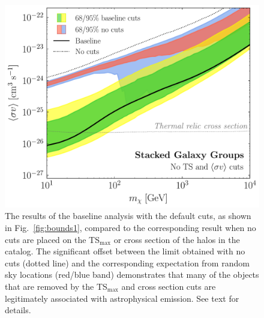 \begin{figure}[tb]
  \centering
  \includegraphics[width=.7\textwidth]{ch-clusters/plots/systematics_nots_cuts.pdf}
  \caption{The results of the baseline analysis with the default cuts, as shown in Fig.~\ref{fig:bounds1}, compared to the corresponding result when no cuts are placed on the TS$_\text{max}$ or cross section of the halos in the catalog.  The significant offset between the limit obtained with no cuts (dotted line) and the corresponding expectation from random sky locations (red/blue band)  demonstrates that many of the objects that are removed by the TS$_\text{max}$ and cross section cuts are  legitimately associated with astrophysical emission. See text for details.}
  \label{fig:systematics_nots_cuts}
\end{figure}

